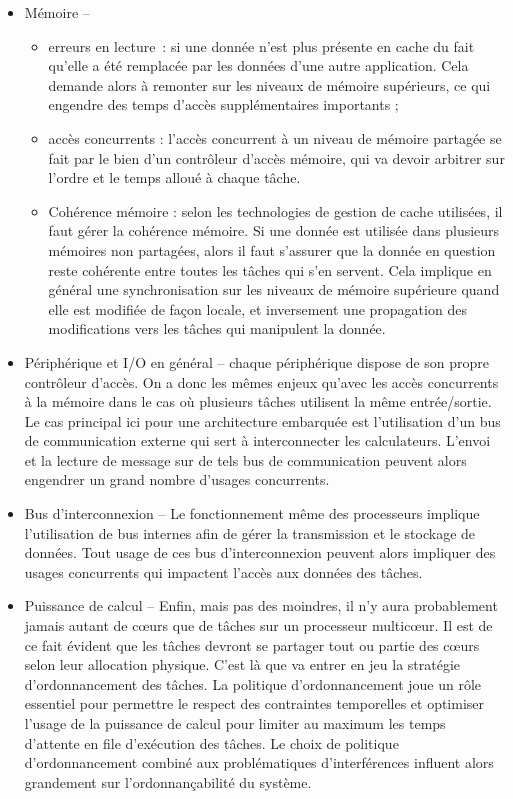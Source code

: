 \documentclass[french, a4paper, 11pt, twoside, pdftex]{StyleThese}
\begin{document}
	\begin{itemize}
		\item Mémoire --
		\begin{itemize}[label=$ \circ $] %
			\item 	erreurs en lecture~: si une donnée n'est plus présente en cache du fait qu'elle a été remplacée par les données d'une autre application. Cela demande alors à remonter sur les niveaux de mémoire supérieurs, ce qui engendre des temps d'accès supplémentaires importants ;
			\item 	accès concurrents : l'accès concurrent à un niveau de mémoire partagée se fait par le bien d'un contrôleur d'accès mémoire, qui va devoir arbitrer sur l'ordre et le temps alloué à chaque tâche.
			\item 	Cohérence mémoire : selon les technologies de gestion de cache utilisées, il faut gérer la cohérence mémoire. Si une donnée est utilisée dans plusieurs mémoires non partagées, alors il faut s'assurer que la donnée en question reste cohérente entre toutes les tâches qui s'en servent. Cela implique en général une synchronisation sur les niveaux de mémoire supérieure quand elle est modifiée de façon locale, et inversement une propagation des modifications vers les tâches qui manipulent la donnée.
		\end{itemize}
		\item Périphérique et I/O en général --
			chaque périphérique dispose de son propre contrôleur d'accès. On a donc les mêmes enjeux qu'avec les accès concurrents à la mémoire dans le cas où plusieurs tâches utilisent la même entrée/sortie. Le cas principal ici pour une architecture embarquée est l'utilisation d'un bus de communication externe qui sert à interconnecter les calculateurs. L'envoi et la lecture de message sur de tels bus de communication peuvent alors engendrer un grand nombre d'usages concurrents. 
		\item Bus d'interconnexion -- 
			Le fonctionnement même des processeurs implique l'utilisation de bus internes afin de gérer la transmission et le stockage de données. Tout usage de ces bus d'interconnexion peuvent alors impliquer des usages concurrents qui impactent l'accès aux données des tâches.
		\item Puissance de calcul -- 
			Enfin, mais pas des moindres, il n'y aura probablement jamais autant de cœurs que de tâches sur un processeur multicœur. Il est de ce fait évident que les tâches devront se partager tout ou partie des cœurs selon leur allocation physique. C'est là que va entrer en jeu la stratégie d'ordonnancement des tâches. La politique d'ordonnancement joue un rôle essentiel pour permettre le respect des contraintes temporelles et optimiser l'usage de la puissance de calcul pour limiter au maximum les temps d'attente en file d'exécution des tâches. Le choix de politique d'ordonnancement combiné aux problématiques d'interférences influent alors grandement sur l'ordonnançabilité du système.
	\end{itemize}
\end{document}
